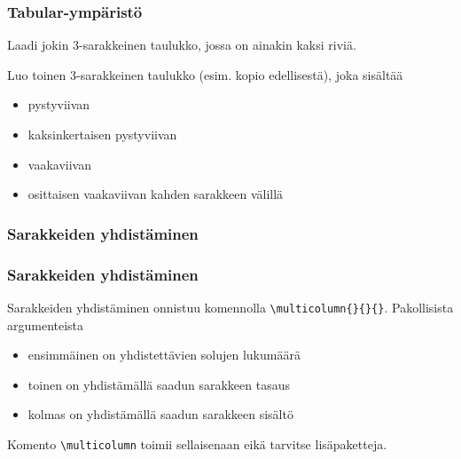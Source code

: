 \begin{fframe}
    \frametitle{Tabular-ympäristö}
    \begin{harj}
        Laadi jokin 3-sarakkeinen taulukko, jossa on ainakin kaksi riviä.  
    \end{harj}
    \begin{harj}
        Luo toinen 3-sarakkeinen taulukko (esim. kopio edellisestä), joka sisältää 
        \begin{itemize}
            \item pystyviivan
            \item kaksinkertaisen pystyviivan
            \item vaakaviivan
            \item osittaisen vaakaviivan kahden sarakkeen välillä
        \end{itemize}
    \end{harj}
\end{fframe}

\subsubsection{Sarakkeiden yhdistäminen}
\begin{fframe}
    \frametitle{Sarakkeiden yhdistäminen}
    Sarakkeiden yhdistäminen onnistuu komennolla \lstinline-\multicolumn{}{}{}-. Pakollisista argumenteista
    \begin{itemize}
        \item ensimmäinen on yhdistettävien solujen lukumäärä
        \pause
        \item toinen on yhdistämällä saadun sarakkeen tasaus
        \pause
        \item kolmas on yhdistämällä saadun sarakkeen sisältö
    \end{itemize}
    \pause
    Komento \lstinline-\multicolumn- toimii sellaisenaan eikä tarvitse lisäpaketteja.
\end{fframe}

